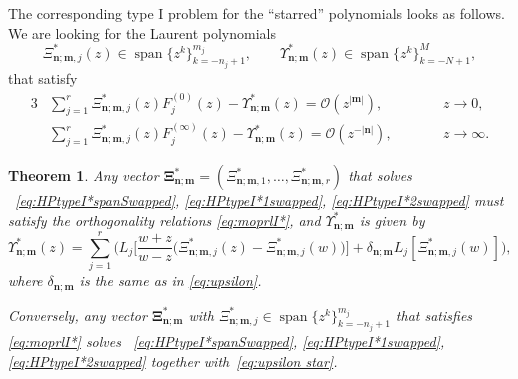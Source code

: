 \documentclass[reqno,centertags,11pt,draft]{amsart}
\newtheorem{thm}{Theorem}[section]
\newcommand{\abs}[1]{\left|#1\right|}
\newcommand{\set}[1]{\left\{#1\right\}}
\begin{document}
The corresponding type I problem for the ``starred'' polynomials looks as follows. We are looking for the Laurent polynomials 
\begin{equation}
    \label{eq:HPtypeI*spanSwapped}
     \Xi^*_{\bm{n};\bm{m},j}(z) \in \operatorname{span}\big\{z^{k}\big\}_{k=-n_j+1}^{m_j},
    \qquad \Upsilon^*_{\bm{n};\bm{m}}(z) \in \operatorname{span}\big\{z^{k}\big\}_{k=-N+1}^{M},
\end{equation}
that satisfy
\begin{alignat}{3}
    \label{eq:HPtypeI*1swapped}
    & \sum_{j = 1}^r \Xi^*_{\bm{n};\bm{m},j}(z)F_j^{(0)}(z) - \Upsilon^*_{\bm{n};\bm{m}}(z) = \mathcal{O}(z^{\abs{\bm{m}}}), \qquad &&z \rightarrow 0, \\
    \label{eq:HPtypeI*2swapped}
    &\sum_{j = 1}^r \Xi^*_{\bm{n};\bm{m},j}(z)F_j^{(\infty)}(z) -\Upsilon^*_{\bm{n};\bm{m}}(z) = \mathcal{O}(z^{-\abs{\bm{n}}}),  \qquad &&z \rightarrow \infty.
\end{alignat}

\begin{thm}
    Any vector $\bm{\Xi}_{\bm{n};\bm{m}}^* = (\Xi_{\bm{n};\bm{m},1}^*,\dots,\Xi_{\bm{n};\bm{m},r}^*)$ that solves ~\eqref{eq:HPtypeI*spanSwapped}, \eqref{eq:HPtypeI*1swapped}, \eqref{eq:HPtypeI*2swapped} must satisfy the orthogonality relations \eqref{eq:moprlI*}, and $\Upsilon_{\bm{n};\bm{m}}^*$ is given by
    \begin{equation}\label{eq:upsilon star}
        \Upsilon_{\bm{n};\bm{m}}^*(z) = \sum_{j = 1}^r \Big( L_j\Big[\frac{w+z}{w-z}\big( \Xi_{\bm{n};\bm{m},j}^*(z) - \Xi_{\bm{n};\bm{m},j}^*(w) \big)\Big] + \delta_{\bm{n};\bm{m}} L_j[\Xi_{\bm{n};\bm{m},j}^*(w)] \Big),
    \end{equation}
    {where $\delta_{\bm{n};\bm{m}}$ is the same as in \eqref{eq:upsilon}.}

    Conversely, any vector $\bm{\Xi}_{\bm{n};\bm{m}}^*$ with $\Xi^*_{\bm{n};\bm{m},j} \in \operatorname{span}\big\{z^{k}\big\}_{k=-n_j+1}^{m_j}$ that satisfies  \eqref{eq:moprlI*} solves  ~\eqref{eq:HPtypeI*spanSwapped}, \eqref{eq:HPtypeI*1swapped}, \eqref{eq:HPtypeI*2swapped} together with~\eqref{eq:upsilon star}.
\end{thm}

\end{document}
